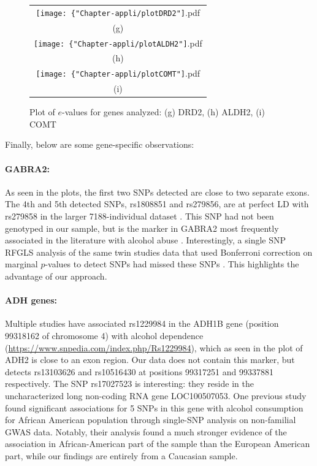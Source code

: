 \begin{figure}
\begin{center}

\begin{tabular}{c}
		\texttt{[image: \{"Chapter-appli/plotDRD2"]}.pdf}\\
		(g)\\
		\texttt{[image: \{"Chapter-appli/plotALDH2"]}.pdf} \\
		(h)\\	
		\texttt{[image: \{"Chapter-appli/plotCOMT"]}.pdf}\\
		(i)\\	
\end{tabular}

\caption{Plot of $e$-values for genes analyzed: (g) DRD2, (h) ALDH2, (i) COMT}
\label{fig:geneplot3}

\end{center}
\end{figure}

Finally, below are some gene-specific observations:

\paragraph{GABRA2:} As seen in the plots, the first two SNPs detected are close to two separate exons. The 4th and 5th detected SNPs, rs1808851 and rs279856, are at perfect LD with rs279858 in the larger 7188-individual dataset \citep{IronsThesis12}. This SNP had not been genotyped in our sample, but is the marker in GABRA2 most frequently associated in the literature with alcohol abuse \citep{CuiEtal12}. Interestingly, a single SNP RFGLS analysis of the same twin studies data that used Bonferroni correction on marginal $p$-values to detect SNPs had missed these SNPs \citep{IronsThesis12}. This highlights the advantage of our approach.

\paragraph{ADH genes:} Multiple studies have associated rs1229984 in the ADH1B gene (position 99318162 of chromosome 4) with alcohol dependence (\url{https://www.snpedia.com/index.php/Rs1229984}), which as seen in the plot of ADH2 is close to an exon region. Our data does not contain this marker, but detects rs13103626 and rs10516430 at positions 99317251 and 99337881 respectively. The SNP rs17027523 is interesting: they reside in the uncharacterized long non-coding RNA gene LOC100507053. One previous study \citep{GelernterEtal14, XuEtal15} found significant associations for 5 SNPs in this gene with alcohol consumption for African American population through single-SNP analysis on non-familial GWAS data. Notably, their analysis found a much stronger evidence of the association in African-American part of the sample than the European American part, while our findings are entirely from a Caucasian sample.

